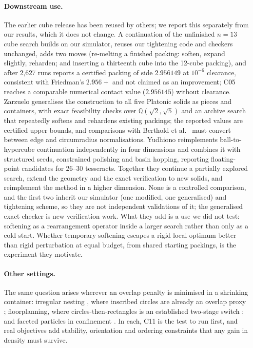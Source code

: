 \paragraph{Downstream use.} The earlier cube release \cite{softtorigidpacking} has been reused by others; we report this separately from our results, which it does not change. A continuation of the unfinished $n=13$ cube search \cite{n13repo} builds on our simulator, reuses our tightening code and checkers unchanged, adds two moves (re-melting a finished packing: soften, expand slightly, reharden; and inserting a thirteenth cube into the 12-cube packing), and after 2{,}627 runs reports a certified packing of side $2.956149$ at $10^{-6}$ clearance, consistent with Friedman's $2.956+$ and not claimed as an improvement; C05 reaches a comparable numerical contact value ($2.956145$) without clearance. Zarzuelo \cite{platonicrepo} generalises the construction to all five Platonic solids as pieces and containers, with exact feasibility checks over $\mathbb{Q}(\sqrt2,\sqrt5)$ and an archive search that repeatedly softens and rehardens existing packings; the reported values are certified upper bounds, and comparisons with Berthold et al.\ \cite{Berthold2026} must convert between edge and circumradius normalisations. Yudhiono \cite{tesseractrepo} reimplements ball-to-hypercube continuation independently in four dimensions and combines it with structured seeds, constrained polishing and basin hopping, reporting floating-point candidates for 26--30 tesseracts. Together they continue a partially explored search, extend the geometry and the exact verification to new solids, and reimplement the method in a higher dimension. None is a controlled comparison, and the first two inherit our simulator (one modified, one generalised) and tightening scheme, so they are not independent validations of it; the generalised exact checker is new verification work. What they add is a use we did not test: softening as a rearrangement operator inside a larger search rather than only as a cold start. Whether temporary softening escapes a rigid local optimum better than rigid perturbation at equal budget, from shared starting packings, is the experiment they motivate.

\paragraph{Other settings.} The same question arises wherever an overlap penalty is minimised in a shrinking container: irregular nesting \cite{Wascher2007,Bennell2008,Leao2020}, where inscribed circles are already an overlap proxy \cite{Jones2014,Gardeyn2025}; floorplanning, where circles-then-rectangles is an established two-stage switch \cite{AnjosVannelli2002,Luo2008}; and faceted particles in confinement \cite{Torquato2018,Wang2018}. In each, C11 is the test to run first, and real objectives add stability, orientation and ordering constraints \cite{Bortfeldt2013,Araujo2019} that any gain in density must survive.
